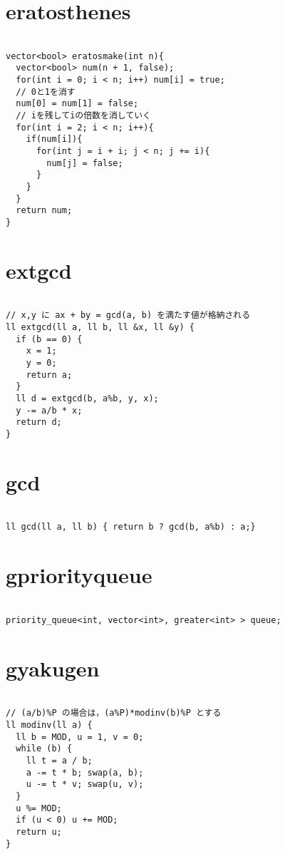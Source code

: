 \documentclass[a4j,titlepage]{jarticle} %
\begin{document}
\color{white}
\section{eratosthenes}
\color{black}
\begin{lstlisting}[caption=eratosthenes]

vector<bool> eratosmake(int n){
  vector<bool> num(n + 1, false);
  for(int i = 0; i < n; i++) num[i] = true;
  // 0と1を消す
  num[0] = num[1] = false;
  // iを残してiの倍数を消していく
  for(int i = 2; i < n; i++){
    if(num[i]){
      for(int j = i + i; j < n; j += i){
        num[j] = false;
      }
    }
  }
  return num;
}

\end{lstlisting}

\color{white}
\section{extgcd}
\color{black}
\begin{lstlisting}[caption=extgcd]

// x,y に ax + by = gcd(a, b) を満たす値が格納される
ll extgcd(ll a, ll b, ll &x, ll &y) {
  if (b == 0) {
    x = 1;
    y = 0;
    return a;
  }
  ll d = extgcd(b, a%b, y, x);
  y -= a/b * x;
  return d;
}

\end{lstlisting}

\color{white}
\section{gcd}
\color{black}
\begin{lstlisting}[caption=gcd]

ll gcd(ll a, ll b) { return b ? gcd(b, a%b) : a;}

\end{lstlisting}

\color{white}
\section{gpriorityqueue}
\color{black}
\begin{lstlisting}[caption=gpriorityqueue]

priority_queue<int, vector<int>, greater<int> > queue;

\end{lstlisting}

\color{white}
\section{gyakugen}
\color{black}
\begin{lstlisting}[caption=gyakugen]

// (a/b)%P の場合は，(a%P)*modinv(b)%P とする
ll modinv(ll a) {
  ll b = MOD, u = 1, v = 0;
  while (b) {
    ll t = a / b;
    a -= t * b; swap(a, b);
    u -= t * v; swap(u, v);
  }
  u %= MOD;
  if (u < 0) u += MOD;
  return u;
}

\end{lstlisting}
\end{document}
